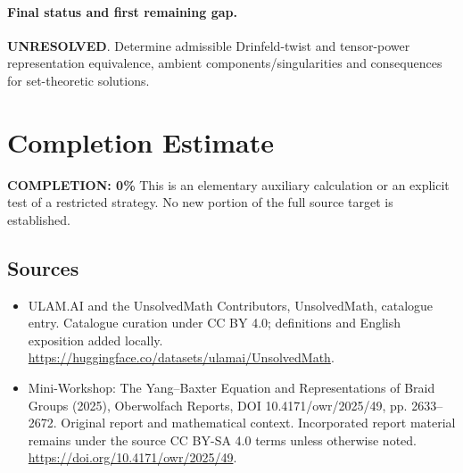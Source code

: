 \documentclass[11pt]{article}
\begin{document}
\paragraph{Final status and first remaining gap.}
\textbf{UNRESOLVED}. Determine admissible Drinfeld-twist and tensor-power representation equivalence, ambient components/singularities and consequences for set-theoretic solutions.

\section{Completion Estimate}
\noindent\textbf{COMPLETION: 0\%}
This is an elementary auxiliary calculation or an explicit test of a restricted strategy. No new portion of the full source target is established.

\subsection{Sources}
\begin{itemize}
\item[\hypertarget{source:statement:1}{S1}] ULAM.AI and the UnsolvedMath Contributors, UnsolvedMath, catalogue entry. Catalogue curation under CC BY 4.0; definitions and English exposition added locally.
\url{https://huggingface.co/datasets/ulamai/UnsolvedMath}.
\item[\hypertarget{source:statement:2}{S2}] Mini-Workshop: The Yang–Baxter Equation and Representations of Braid Groups (2025), Oberwolfach Reports, DOI 10.4171/owr/2025/49, pp. 2633--2672. Original report and mathematical context. Incorporated report material remains under the source CC BY-SA 4.0 terms unless otherwise noted.
\url{https://doi.org/10.4171/owr/2025/49}.
\end{itemize}
\label{end:statement}
\end{document}
